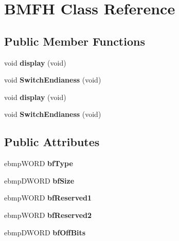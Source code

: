 \hypertarget{class_b_m_f_h}{\section{B\-M\-F\-H Class Reference}
\label{class_b_m_f_h}
}
\subsection*{Public Member Functions}
\begin{DoxyCompactItemize}
\item 
\hypertarget{class_b_m_f_h_a66ce85f14dfc812a2692a227af6cb225}{void {\bfseries display} (void)}\label{class_b_m_f_h_a66ce85f14dfc812a2692a227af6cb225}

\item 
\hypertarget{class_b_m_f_h_a749e4bb6cfa10ed9fa77c3578c471110}{void {\bfseries Switch\-Endianess} (void)}\label{class_b_m_f_h_a749e4bb6cfa10ed9fa77c3578c471110}

\item 
\hypertarget{class_b_m_f_h_a66ce85f14dfc812a2692a227af6cb225}{void {\bfseries display} (void)}\label{class_b_m_f_h_a66ce85f14dfc812a2692a227af6cb225}

\item 
\hypertarget{class_b_m_f_h_a749e4bb6cfa10ed9fa77c3578c471110}{void {\bfseries Switch\-Endianess} (void)}\label{class_b_m_f_h_a749e4bb6cfa10ed9fa77c3578c471110}

\end{DoxyCompactItemize}
\subsection*{Public Attributes}
\begin{DoxyCompactItemize}
\item 
\hypertarget{class_b_m_f_h_a214beda14254f1eb53b192f788622cc5}{ebmp\-W\-O\-R\-D {\bfseries bf\-Type}}\label{class_b_m_f_h_a214beda14254f1eb53b192f788622cc5}

\item 
\hypertarget{class_b_m_f_h_a0b9654dc1130f38957058cd7385920cc}{ebmp\-D\-W\-O\-R\-D {\bfseries bf\-Size}}\label{class_b_m_f_h_a0b9654dc1130f38957058cd7385920cc}

\item 
\hypertarget{class_b_m_f_h_a72e928c772aba8fe4828f78dddf5bd0d}{ebmp\-W\-O\-R\-D {\bfseries bf\-Reserved1}}\label{class_b_m_f_h_a72e928c772aba8fe4828f78dddf5bd0d}

\item 
\hypertarget{class_b_m_f_h_acb35df8e47efd20b50968ca252758678}{ebmp\-W\-O\-R\-D {\bfseries bf\-Reserved2}}\label{class_b_m_f_h_acb35df8e47efd20b50968ca252758678}

\item 
\hypertarget{class_b_m_f_h_a3ede15c91c9ce0a65c68fe2be591448a}{ebmp\-D\-W\-O\-R\-D {\bfseries bf\-Off\-Bits}}\label{class_b_m_f_h_a3ede15c91c9ce0a65c68fe2be591448a}

\end{DoxyCompactItemize}


